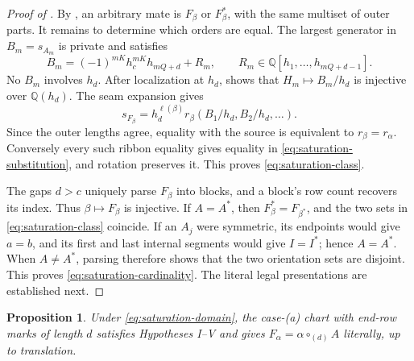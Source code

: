 \documentclass[11pt,a4paper]{amsart}
\numberwithin{equation}{section}
\theoremstyle{plain}
\newtheorem{proposition}[theorem]{Proposition}
\theoremstyle{definition}
\begin{document}
\begin{proof}[Proof of ]
By , an arbitrary mate is
\(F_\beta\) or \(F_\beta^*\), with the same multiset of outer
parts.  It remains to determine which orders are equal.
The largest generator in \(B_m=s_{A_m}\) is private and satisfies
\begin{equation}\label{eq:private-saturation-corner}
 B_m=(-1)^{mK}h_c^{mK}h_{mQ+d}+R_m,\qquad
 R_m\in\mathbb Q[h_1,\ldots,h_{mQ+d-1}].
\end{equation}
No \(B_m\) involves \(h_d\).  After localization at \(h_d\),
 shows that
\(H_m\mapsto B_m/h_d\) is injective over \(\mathbb Q(h_d)\).
The seam expansion gives
\begin{equation}\label{eq:saturation-substitution}
 s_{F_\beta}=h_d^{\ell(\beta)}
 r_\beta(B_1/h_d,B_2/h_d,\ldots).
\end{equation}
Since the outer lengths agree, equality with the source is equivalent to
\(r_\beta=r_\alpha\).  Conversely every such ribbon equality
gives equality in \eqref{eq:saturation-substitution}, and rotation
preserves it.  This proves \eqref{eq:saturation-class}.

The gaps \(d>c\) uniquely parse \(F_\beta\) into blocks, and a
block's row count recovers its index.  Thus \(\beta\mapsto F_\beta\)
is injective.  If \(A=A^*\), then
\(F_\beta^*=F_{\beta^*}\), and the two sets in
\eqref{eq:saturation-class} coincide.  If an \(A_j\) were symmetric,
its endpoints would give \(a=b\), and its first and last internal
segments would give \(I=I^*\); hence \(A=A^*\).
When \(A\ne A^*\), parsing therefore shows that the two orientation
sets are disjoint.  This proves \eqref{eq:saturation-cardinality}.
The literal legal presentations are established next.
\end{proof}

\begin{proposition}\label{prop:saturation-chart}
Under \eqref{eq:saturation-domain}, the case-(a) chart with end-row
marks of length \(d\) satisfies Hypotheses I--V and gives
\(F_\alpha=\alpha\circ_{(d)}A\) literally, up to translation.
\end{proposition}
\end{document}
